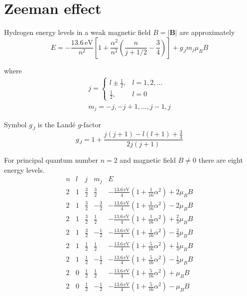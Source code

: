 

\section*{Zeeman effect}

Hydrogen energy levels in a weak magnetic field $B=|\mathbf B|$ are approximately
\begin{equation*}
E=-\frac{13.6\,\text{eV}}{n^2}
\left[
1+\frac{\alpha^2}{n^2}\left(\frac{n}{j+1/2}-\frac{3}{4}\right)
\right]+g_Jm_j\mu_BB
\end{equation*}

where
\begin{gather*}
j=\begin{cases}
l\pm\frac{1}{2}, & l=1,2,\ldots
\\
\frac{1}{2}, & l=0
\end{cases}
\\[1ex]
m_j=-j,-j+1,\ldots,j-1,j
\end{gather*}

Symbol $g_J$ is the Land\'e $g$-factor
\begin{equation*}
g_J=1+\frac{j(j+1)-l(l+1)+\frac{3}{4}}{2j(j+1)}
\end{equation*}

For principal quantum number $n=2$ and magnetic field $B\ne0$ there are eight energy levels.
\begin{equation*}
\begin{matrix}
n & l & j & m_j & E
\\[2ex]
2 & 1 & \frac{3}{2} & \frac{3}{2} &
-\frac{13.6\,\text{eV}}{4}\left(1+\tfrac{1}{16}\alpha^2\right)+2\mu_BB
\\[2ex]
2 & 1 & \frac{3}{2} & -\frac{3}{2} &
-\frac{13.6\,\text{eV}}{4}\left(1+\tfrac{1}{16}\alpha^2\right)-2\mu_BB
\\[2ex]
2 & 1 & \frac{3}{2} & \frac{1}{2} &
-\frac{13.6\,\text{eV}}{4}\left(1+\tfrac{1}{16}\alpha^2\right)+\frac{2}{3}\mu_BB
\\[2ex]
2 & 1 & \frac{3}{2} & -\frac{1}{2} &
-\frac{13.6\,\text{eV}}{4}\left(1+\tfrac{1}{16}\alpha^2\right)-\frac{2}{3}\mu_BB
\\[2ex]
2 & 1 & \frac{1}{2} & \frac{1}{2} &
-\frac{13.6\,\text{eV}}{4}\left(1+\tfrac{5}{16}\alpha^2\right)+\frac{1}{3}\mu_BB
\\[2ex]
2 & 1 & \frac{1}{2} & -\frac{1}{2} &
-\frac{13.6\,\text{eV}}{4}\left(1+\tfrac{5}{16}\alpha^2\right)-\frac{1}{3}\mu_BB
\\[2ex]
2 & 0 & \frac{1}{2} & \frac{1}{2} &
-\frac{13.6\,\text{eV}}{4}\left(1+\tfrac{5}{16}\alpha^2\right)+\mu_BB
\\[2ex]
2 & 0 & \frac{1}{2} & -\frac{1}{2} &
-\frac{13.6\,\text{eV}}{4}\left(1+\tfrac{5}{16}\alpha^2\right)-\mu_BB
\end{matrix}
\end{equation*}



